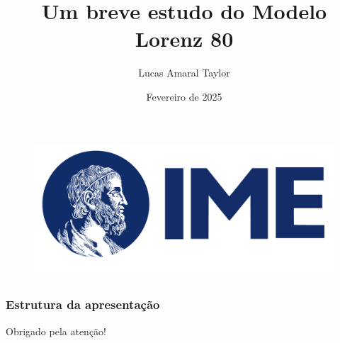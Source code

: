 \documentclass[
    11pt,               %
    aspectratio=169,   %
]{beamer}
\title[Lorenz 80]{Um breve estudo do Modelo Lorenz 80}
\author[TAYLOR, Lucas A.]{Lucas Amaral Taylor}
\institute[IME-USP]{Instituto de Matemática e Estatística \\ (IME-USP)}
\date{Fevereiro de 2025}
\begin{document}
\begin{frame}
    \begin{figure}
        \includegraphics[width=0.4\linewidth]{img/logo_IME.png}
    \end{figure}
    \titlepage
\end{frame}

\begin{frame}
    \frametitle{Estrutura da apresentação}
    \tableofcontents
\end{frame}








\begin{frame}
    \begin{center}
        {\Huge Obrigado pela atenção!}
    \end{center}
\end{frame}
\end{document}
